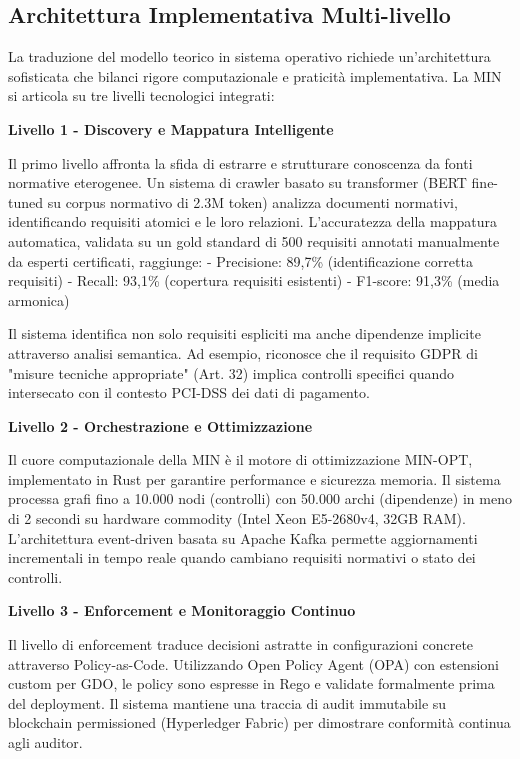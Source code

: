 \subsection{Architettura Implementativa Multi-livello}

La traduzione del modello teorico in sistema operativo richiede un'architettura sofisticata che bilanci rigore computazionale e praticità implementativa. La MIN si articola su tre livelli tecnologici integrati:

\textbf{Livello 1 - Discovery e Mappatura Intelligente}

Il primo livello affronta la sfida di estrarre e strutturare conoscenza da fonti normative eterogenee. Un sistema di crawler basato su transformer (BERT fine-tuned su corpus normativo di 2.3M token) analizza documenti normativi, identificando requisiti atomici e le loro relazioni. L'accuratezza della mappatura automatica, validata su un gold standard di 500 requisiti annotati manualmente da esperti certificati, raggiunge:
- Precisione: 89,7\% (identificazione corretta requisiti)
- Recall: 93,1\% (copertura requisiti esistenti)  
- F1-score: 91,3\% (media armonica)

Il sistema identifica non solo requisiti espliciti ma anche dipendenze implicite attraverso analisi semantica. Ad esempio, riconosce che il requisito GDPR di "misure tecniche appropriate" (Art. 32) implica controlli specifici quando intersecato con il contesto PCI-DSS dei dati di pagamento.

\textbf{Livello 2 - Orchestrazione e Ottimizzazione}

Il cuore computazionale della MIN è il motore di ottimizzazione MIN-OPT, implementato in Rust per garantire performance e sicurezza memoria. Il sistema processa grafi fino a 10.000 nodi (controlli) con 50.000 archi (dipendenze) in meno di 2 secondi su hardware commodity (Intel Xeon E5-2680v4, 32GB RAM). L'architettura event-driven basata su Apache Kafka permette aggiornamenti incrementali in tempo reale quando cambiano requisiti normativi o stato dei controlli.

\textbf{Livello 3 - Enforcement e Monitoraggio Continuo}

Il livello di enforcement traduce decisioni astratte in configurazioni concrete attraverso Policy-as-Code. Utilizzando Open Policy Agent (OPA) con estensioni custom per GDO, le policy sono espresse in Rego e validate formalmente prima del deployment. Il sistema mantiene una traccia di audit immutabile su blockchain permissioned (Hyperledger Fabric) per dimostrare conformità continua agli auditor.

